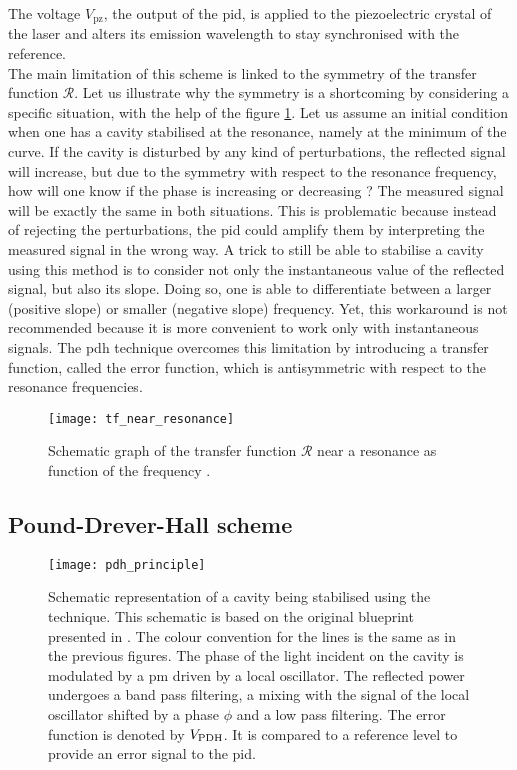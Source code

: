 The voltage $V_{\text{pz}}$, the output of the \gls{pid}, is applied to the piezoelectric crystal of the laser and alters its emission wavelength to stay synchronised with the reference.\\

The main limitation of this scheme is linked to the symmetry of the transfer function $\mathcal{R}$. Let us illustrate why the symmetry is a shortcoming by considering a specific situation, with the help of the figure \ref{tf_near_resonance}.  Let us assume an initial condition when one has a cavity stabilised at the resonance, namely at the minimum of the curve. If the cavity is disturbed by any kind of perturbations, the reflected signal will increase, but due to the symmetry with respect to the resonance frequency, how will one know if the phase is increasing or decreasing ? The measured signal will be exactly the same in both situations. This is problematic because instead of rejecting the perturbations, the \gls{pid} could amplify them by interpreting the measured signal in the wrong way. A trick to still be able to stabilise a cavity using this method is to consider not only the instantaneous value of the reflected signal, but also its slope. Doing so, one is able to differentiate between a larger (positive slope) or smaller (negative slope) frequency. Yet, this workaround is not recommended because it is more convenient to work only with instantaneous signals. The \gls{pdh} technique overcomes this limitation by introducing a transfer function, called the error function, which is antisymmetric with respect to the resonance frequencies.

\begin{figure}
	\centering
	\texttt{[image: tf\_near\_resonance]}
	\caption{Schematic graph of the transfer function $\mathcal{R}$ near a resonance as function of the frequency \cite{nickersonreview}.}
	\label{tf_near_resonance}
\end{figure}


\subsection{Pound-Drever-Hall scheme}

\label{subsec-pdh-technique}

\begin{figure}[h]
	\centering
	\texttt{[image: pdh\_principle]}
	\caption{Schematic representation of a cavity being stabilised using the \pdh technique. This schematic is based on the original blueprint presented in \cite{drever1983laser}. The colour convention for the lines is the same as in the previous figures. The phase of the light incident on the cavity is modulated by a \gls{pm} driven by a local oscillator. The reflected power undergoes a band pass filtering, a mixing with the signal of the local oscillator shifted by a phase $\phi$ and a low pass filtering. The \pdh error function is denoted by $V_{\text{PDH}}$. It is compared to a reference level to provide an error signal to the \gls{pid}.}
	\label{pdh_principle}
\end{figure}


